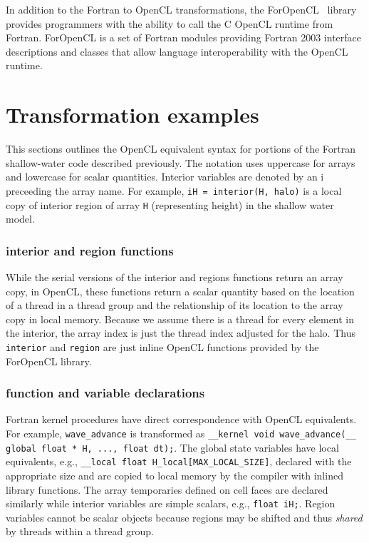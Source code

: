 In addition to the Fortran to OpenCL transformations, the
ForOpenCL~\cite{ofp:sf} library provides programmers with the ability to
call the C OpenCL runtime from Fortran.  ForOpenCL is a set of Fortran modules
providing Fortran 2003 interface descriptions and classes that allow language
interoperability with the OpenCL runtime.


\section{Transformation examples}

This sections outlines the OpenCL equivalent syntax for portions of the
Fortran shallow-water code described previously.  The notation
uses uppercase for arrays and lowercase for scalar quantities.  Interior
variables are denoted by an i preceeding the array name.  For
example, {\tt iH = interior(H, halo)} is a local copy of interior region of
array {\tt H} (representing height) in the shallow water model.

\subsubsection{interior and region functions}

While the serial versions of the interior and regions functions return an
array copy, in OpenCL, these functions return a scalar quantity based on the
location of a thread in a thread group and the relationship of its location to
the array copy in local memory.  Because we assume there is a thread for every
element in the interior, the array index is just the thread index adjusted for
the halo.  Thus {\tt interior} and {\tt region} are just inline OpenCL
functions provided by the ForOpenCL library.

\subsubsection{function and variable declarations}

Fortran kernel procedures have direct correspondence with OpenCL equivalents.
For example, {\tt wave\_advance} is transformed as {\tt \_\_kernel void
  wave\_advance(\_\_ global float * H, ..., float dt);}.  The global state
variables have local equivalents, e.g., {\tt \_\_local float
  H\_local[MAX\_LOCAL\_SIZE]}, declared with the appropriate size and are
copied to local memory by the compiler with inlined library functions.  The
array temporaries defined on cell faces are declared similarly while interior
variables are simple scalars, e.g., {\tt float iH;}.  Region variables cannot
be scalar objects because regions may be shifted and thus \emph{shared} by
threads within a thread group.


